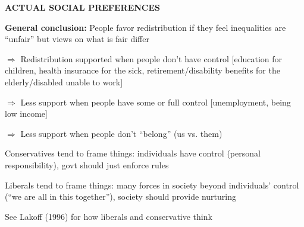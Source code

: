 \documentclass[landscape]{slides}
\begin{document}
\begin{slide}

\end{slide}

\begin{slide}

\end{slide}


\begin{slide}
\begin{center}
{\bf ACTUAL SOCIAL PREFERENCES}
\end{center}
\textbf{General conclusion:} People favor redistribution if they feel inequalities are ``unfair''  but views on what is fair differ

$\Rightarrow$  Redistribution supported when people don't have control [education for children, health insurance for the sick, retirement/disability benefits for the elderly/disabled unable to work]

$\Rightarrow$  Less support when people have some or full control [unemployment, being low income]

$\Rightarrow$  Less support when people don't ``belong'' (us vs. them)

Conservatives tend to frame things: individuals have control (personal responsibility), govt should just enforce rules

\vspace{-10pt}

Liberals tend to frame things: many forces in society beyond individuals' control (``we are all in this together''), society
should provide nurturing

\vspace{-5pt}
\small See Lakoff (1996) for how liberals and conservative think
\end{slide}


%

%
%
\end{document}
